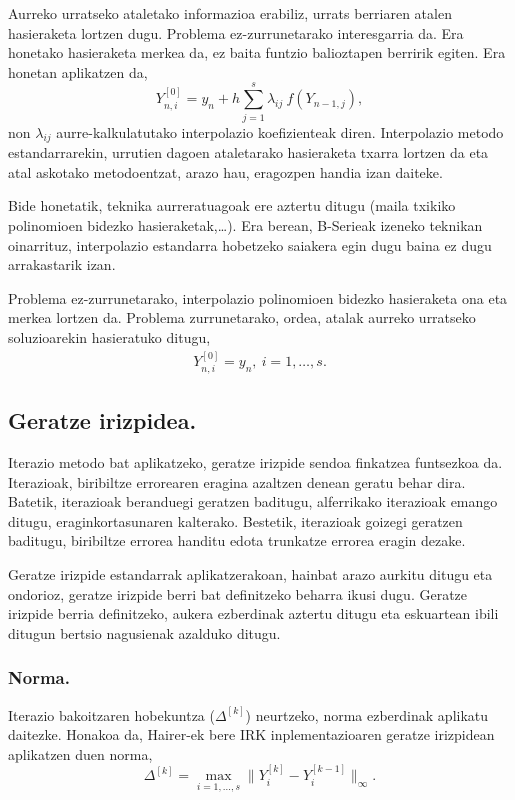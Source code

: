 \begin{enumerate}
Aurreko urratseko ataletako informazioa erabiliz, urrats berriaren atalen hasieraketa lortzen dugu. Problema ez-zurrunetarako interesgarria da. Era honetako hasieraketa merkea da, ez baita funtzio balioztapen berririk egiten. Era honetan aplikatzen da,
\begin{equation*}
Y_{n,i}^{[0]}=y_n+h \sum_{j=1}^{s} \lambda_{ij} \ f(Y_{n-1,j}),
\end{equation*}
non $\lambda_{ij}$ aurre-kalkulatutako interpolazio koefizienteak diren. Interpolazio metodo estandarrarekin, urrutien dagoen ataletarako hasieraketa txarra lortzen da eta atal askotako metodoentzat, arazo hau, eragozpen handia izan daiteke. 


Bide honetatik, teknika aurreratuagoak ere aztertu ditugu (maila txikiko polinomioen bidezko hasieraketak,\dots). Era berean, B-Serieak izeneko teknikan \cite{Chartier2010} oinarrituz, interpolazio estandarra \cite{Laburta1998} hobetzeko saiakera egin dugu baina ez dugu arrakastarik izan.  

\end{enumerate}

Problema ez-zurrunetarako, interpolazio polinomioen bidezko hasieraketa ona eta merkea lortzen da. Problema zurrunetarako, ordea, atalak aurreko urratseko soluzioarekin hasieratuko ditugu,
\begin{align*}
Y_{n,i}^{[0]}=y_n, \ i=1,\dots,s.  
\end{align*}
    

\subsection*{Geratze irizpidea.}

Iterazio metodo bat aplikatzeko, geratze irizpide sendoa finkatzea funtsezkoa da.  Iterazioak, biribiltze errorearen eragina azaltzen denean geratu behar dira. Batetik, iterazioak beranduegi geratzen baditugu, alferrikako iterazioak emango ditugu, eraginkortasunaren kalterako. Bestetik, iterazioak goizegi geratzen baditugu, biribiltze errorea handitu edota trunkatze errorea eragin dezake.  

Geratze irizpide estandarrak aplikatzerakoan, hainbat arazo aurkitu ditugu eta ondorioz, geratze irizpide berri bat definitzeko beharra ikusi dugu. Geratze irizpide berria definitzeko, aukera ezberdinak aztertu ditugu eta eskuartean ibili ditugun bertsio nagusienak azalduko ditugu.      

\subsubsection*{Norma.}
Iterazio bakoitzaren hobekuntza ($\Delta^{[k]}$) neurtzeko, norma ezberdinak aplikatu daitezke. Honakoa da,  Hairer-ek bere IRK inplementazioaren geratze irizpidean aplikatzen duen norma,
\begin{equation*}
\Delta^{[k]}= \max_{i=1,\dots,s} \|Y_i^{[k]}-Y_i^{[k-1]}\|_{\infty}.
\end{equation*}

